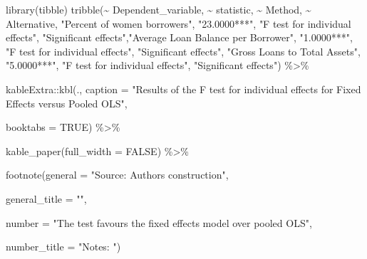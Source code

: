 \documentclass[a4paper,nobind]{templates/ociamthesis}
\newenvironment{Shaded}{\begin{snugshade}}{\end{snugshade}}
\newcommand{\AttributeTok}[1]{\textcolor[rgb]{0.77,0.63,0.00}{#1}}
\newcommand{\ConstantTok}[1]{\textcolor[rgb]{0.00,0.00,0.00}{#1}}
\newcommand{\FunctionTok}[1]{\textcolor[rgb]{0.00,0.00,0.00}{#1}}
\newcommand{\NormalTok}[1]{#1}
\newcommand{\SpecialCharTok}[1]{\textcolor[rgb]{0.00,0.00,0.00}{#1}}
\newcommand{\StringTok}[1]{\textcolor[rgb]{0.31,0.60,0.02}{#1}}
\renewenvironment{Shaded}
{
  \vspace{10pt}%
  \begin{snugshade}%
}{%
  \end{snugshade}%
  \vspace{8pt}%
}
\begin{document}
\begin{Shaded}
\begin{Highlighting}[]
\FunctionTok{library}\NormalTok{(tibble)}
\FunctionTok{tribble}\NormalTok{(}\SpecialCharTok{\textasciitilde{}}\NormalTok{ Dependent\_variable, }\SpecialCharTok{\textasciitilde{}}\NormalTok{ statistic, }\SpecialCharTok{\textasciitilde{}}\NormalTok{ Method, }\SpecialCharTok{\textasciitilde{}}\NormalTok{ Alternative,}
        \StringTok{"Percent of women borrowers"}\NormalTok{, }\StringTok{"23.0000***"}\NormalTok{, }\StringTok{"F test for individual effects"}\NormalTok{, }\StringTok{"Significant effects"}\NormalTok{,}\StringTok{"Average Loan Balance per Borrower"}\NormalTok{, }\StringTok{"1.0000***"}\NormalTok{, }\StringTok{"F test for individual effects"}\NormalTok{, }\StringTok{"Significant effects"}\NormalTok{, }\StringTok{"Gross Loans to Total Assets"}\NormalTok{, }\StringTok{"5.0000***"}\NormalTok{, }\StringTok{"F test for individual effects"}\NormalTok{, }\StringTok{"Significant effects"}\NormalTok{) }\SpecialCharTok{\%\textgreater{}\%} 
  
\NormalTok{kableExtra}\SpecialCharTok{::}\FunctionTok{kbl}\NormalTok{(., }\AttributeTok{caption =} \StringTok{"Results of the F test for individual effects for Fixed Effects versus Pooled OLS"}\NormalTok{, }
      
  \AttributeTok{booktabs =} \ConstantTok{TRUE}\NormalTok{) }\SpecialCharTok{\%\textgreater{}\%} 
  
  \FunctionTok{kable\_paper}\NormalTok{(}\AttributeTok{full\_width =} \ConstantTok{FALSE}\NormalTok{) }\SpecialCharTok{\%\textgreater{}\%} 
  
  \FunctionTok{footnote}\NormalTok{(}\AttributeTok{general =} \StringTok{"Source: Authors\textquotesingle{} construction"}\NormalTok{,}
           
  \AttributeTok{general\_title =} \StringTok{""}\NormalTok{,}
  
  \AttributeTok{number =} \StringTok{"The test favours the fixed effects model over pooled OLS"}\NormalTok{,}
  
  \AttributeTok{number\_title =} \StringTok{"Notes: "}\NormalTok{) }
\end{Highlighting}
\end{Shaded}
\end{document}
